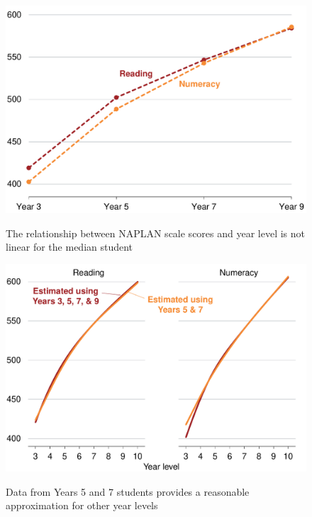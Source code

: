 \begin{figure}[p] 
 \caption{The relationship between NAPLAN scale scores and year level is not linear for the median student}
 \includegraphics[page=1]{atlas/PoP.pdf}\label{fig:PoP}

\end{figure}
\begin{figure}[p]
 \caption{Data from Years 5 and 7 students provides a reasonable approximation for other year levels}
 \includegraphics[page=1]{atlas/five_seven.pdf}\label{fig:57}
\end{figure}


